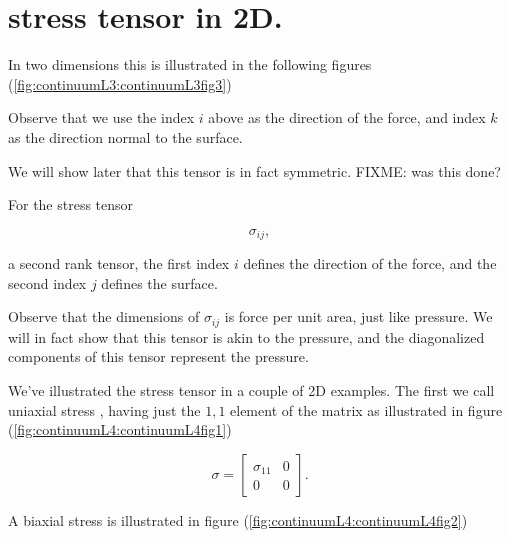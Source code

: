 \label{chap:continuumL4}

\section{stress tensor in 2D.}

In two dimensions this is illustrated in the following figures (\ref{fig:continuumL3:continuumL3fig3})

Observe that we use the index $i$ above as the direction of the force, and index $k$ as the direction normal to the surface.

We will show later that this tensor is in fact symmetric.  FIXME: was this done?

For the stress tensor

\begin{equation}\label{eqn:continuumL4:10}
\sigma_{ij},
\end{equation}

a second rank tensor, the first index $i$ defines the direction of the force, and the second index $j$ defines the surface.

Observe that the dimensions of $\sigma_{ij}$ is force per unit area, just like pressure.  We will in fact show that this tensor is akin to the pressure, and the diagonalized components of this tensor represent the pressure.

We've illustrated the stress tensor in a couple of 2D examples.  The first we call uniaxial stress , having just the $1,1$ element of the matrix as illustrated in figure (\ref{fig:continuumL4:continuumL4fig1})


\begin{equation}\label{eqn:continuumL4:30}
\sigma = 
\begin{bmatrix}
\sigma_{11} & 0 \\
0 & 0
\end{bmatrix}.
\end{equation}

A biaxial stress  is illustrated in figure (\ref{fig:continuumL4:continuumL4fig2})

